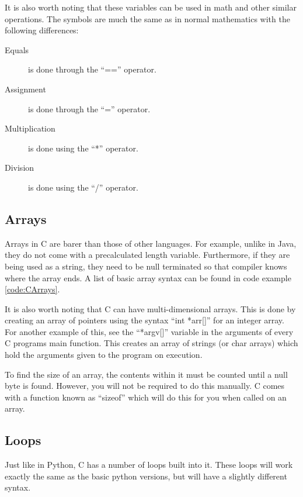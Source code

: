 			It is also worth noting that these variables can be used in math and other similar operations. 
			The symbols are much the same as in normal mathematics with the following differences:
			\begin{description}
				\item[Equals] is done through the ``=='' operator.
				\item[Assignment] is done through the ``='' operator.
				\item[Multiplication] is done using the ``*'' operator.
				\item[Division] is done using the ``/'' operator. 
			\end{description}

		\subsection{Arrays}
			Arrays in C are barer than those of other languages. 
			For example, unlike in Java, they do not come with a precalculated length variable.
			Furthermore, if they are being used as a string, they need to be null terminated so that compiler knows where the array ends. 
			A list of basic array syntax can be found in code example \ref{code:CArrays}.
			\begin{code}
				C}]{./arrays.c}
				\caption{A List of Different Array Syntax}
				\label{code:CArrays}
			\end{code}
			It is also worth noting that C can have multi-dimensional arrays. 
			This is done by creating an array of pointers using the syntax ``int *arr[]'' for an integer array. 
			For another example of this, see the ``*argv[]'' variable in the arguments of every C programs main function. 
			This creates an array of strings (or char arrays) which hold the arguments given to the program on execution. 

			To find the size of an array, the contents within it must be counted until a null byte is found. 
			However, you will not be required to do this manually. 
			C comes with a function known as ``sizeof'' which will do this for you when called on an array. 
		\subsection{Loops}
			Just like in Python, C has a number of loops built into it. 
			These loops will work exactly the same as the basic python versions, but will have a slightly different syntax. 
			
